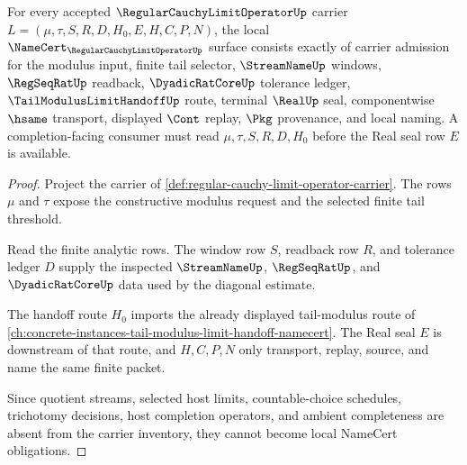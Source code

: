 \begin{theorem}
\label{thm:regular-cauchy-limit-operator-namecert-obligations}
For every accepted $\RegularCauchyLimitOperatorUp$ carrier $L=(\mu,\tau,S,R,D,H_0,E,H,C,P,N)$, the local $\NameCert_{\RegularCauchyLimitOperatorUp}$ surface consists exactly of carrier admission for the modulus input, finite tail selector, $\StreamNameUp$ windows, $\RegSeqRatUp$ readback, $\DyadicRatCoreUp$ tolerance ledger, $\TailModulusLimitHandoffUp$ route, terminal $\RealUp$ seal, componentwise $\hsame$ transport, displayed $\Cont$ replay, $\Pkg$ provenance, and local naming. A completion-facing consumer must read $\mu,\tau,S,R,D,H_0$ before the Real seal row $E$ is available.
\end{theorem}
\begin{proof}
Project the carrier of \autoref{def:regular-cauchy-limit-operator-carrier}. The rows $\mu$ and $\tau$ expose the constructive modulus request and the selected finite tail threshold.

Read the finite analytic rows. The window row $S$, readback row $R$, and tolerance ledger $D$ supply the inspected $\StreamNameUp$, $\RegSeqRatUp$, and $\DyadicRatCoreUp$ data used by the diagonal estimate.

The handoff route $H_0$ imports the already displayed tail-modulus route of \autoref{ch:concrete-instances-tail-modulus-limit-handoff-namecert}. The Real seal $E$ is downstream of that route, and $H,C,P,N$ only transport, replay, source, and name the same finite packet.

Since quotient streams, selected host limits, countable-choice schedules, trichotomy decisions, host completion operators, and ambient completeness are absent from the carrier inventory, they cannot become local NameCert obligations.
\end{proof}

